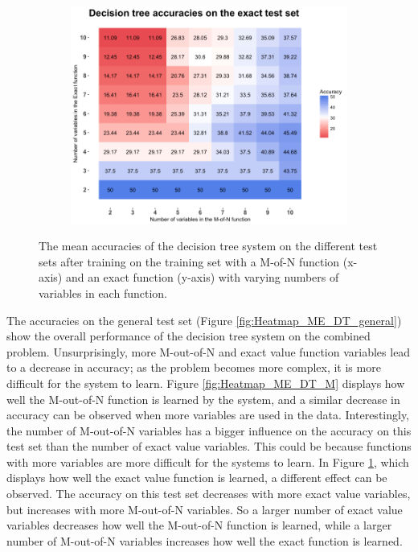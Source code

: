 \documentclass[letterpaper]{article} %
\begin{document}
\begin{figure}
   \begin{subfigure}[t]{0.45\textwidth}
        \includegraphics[width = 1 \linewidth]{Figures/Heatmap_ME_DT_E.png}
		\caption{}       
        \label{fig:Heatmap_ME_DT_E}
    \end{subfigure}%
    \caption{The mean accuracies of the decision tree system on the different test sets after training on the training set with a M-of-N function (x-axis) and an exact function (y-axis) with varying numbers of variables in each function.}
    \label{fig:Heatmap_ME}
\end{figure}

The accuracies on the general test set (Figure \ref{fig:Heatmap_ME_DT_general}) show the overall performance of the decision tree system on the combined problem. Unsurprisingly, more M-out-of-N and exact value function variables lead to a decrease in accuracy; as the problem becomes more complex, it is more difficult for the system to learn. Figure \ref{fig:Heatmap_ME_DT_M} displays how well the M-out-of-N function is learned by the system, and a similar decrease in accuracy can be observed when more variables are used in the data. Interestingly, the number of M-out-of-N variables has a bigger influence on the accuracy on this test set than the number of exact value variables. This could be because functions with more variables are more difficult for the systems to learn. In Figure \ref{fig:Heatmap_ME_DT_E}, which displays how well the exact value function is learned, a different effect can be observed. The accuracy on this test set decreases with more exact value variables, but increases with more M-out-of-N variables. So a larger number of
exact value variables decreases how well the M-out-of-N function is learned, while a larger number of M-out-of-N variables increases how well the exact function is learned. 
\end{document}

